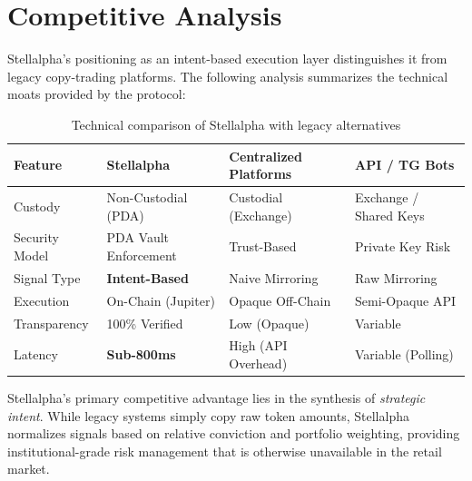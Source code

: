 \section{Competitive Analysis}

Stellalpha's positioning as an intent-based execution layer distinguishes it from legacy copy-trading platforms. The following analysis summarizes the technical moats provided by the protocol:

\begin{table}[H]
\centering
\small
\begin{tabular}{p{2.8cm} p{3.2cm} p{4.2cm} p{3.8cm}}
\toprule
\textbf{Feature} & \textbf{Stellalpha} & \textbf{Centralized Platforms} & \textbf{API / TG Bots} \\
\midrule
Custody & Non-Custodial (PDA) & Custodial (Exchange) & Exchange / Shared Keys \\
Security Model & PDA Vault Enforcement & Trust-Based & Private Key Risk \\ 
Signal Type & \textbf{Intent-Based} & Naive Mirroring & Raw Mirroring \\
Execution & On-Chain (Jupiter) & Opaque Off-Chain & Semi-Opaque API \\ 
Transparency & 100\% Verified & Low (Opaque) & Variable \\        
Latency & \textbf{Sub-800ms} & High (API Overhead) & Variable (Polling) \\
\bottomrule
\end{tabular}
\caption{Technical comparison of Stellalpha with legacy alternatives}      
\end{table}

Stellalpha's primary competitive advantage lies in the synthesis of \textit{strategic intent}. While legacy systems simply copy raw token amounts, Stellalpha normalizes signals based on relative conviction and portfolio weighting, providing institutional-grade risk management that is otherwise unavailable in the retail market.
